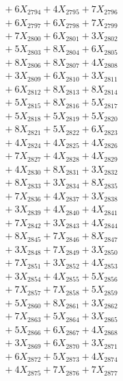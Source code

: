 \documentclass[a4paper,10pt]{article}
\begin{document}
{\begin{align}
&\;  + 6 X_{2794} + 4 X_{2795} + 7 X_{2796} \\[0.3ex]
&\;  + 6 X_{2797} + 6 X_{2798} + 7 X_{2799} \\[0.5ex]\allowbreak
&\;  + 7 X_{2800} + 6 X_{2801} + 3 X_{2802} \\[0.3ex]
&\;  + 5 X_{2803} + 8 X_{2804} + 6 X_{2805} \\[0.3ex]
&\;  + 8 X_{2806} + 8 X_{2807} + 4 X_{2808} \\[0.3ex]
&\;  + 3 X_{2809} + 6 X_{2810} + 3 X_{2811} \\[0.3ex]
&\;  + 6 X_{2812} + 8 X_{2813} + 8 X_{2814} \\[0.3ex]
&\;  + 5 X_{2815} + 8 X_{2816} + 5 X_{2817} \\[0.3ex]
&\;  + 5 X_{2818} + 5 X_{2819} + 5 X_{2820} \\[0.3ex]
&\;  + 8 X_{2821} + 5 X_{2822} + 6 X_{2823} \\[0.3ex]
&\;  + 4 X_{2824} + 4 X_{2825} + 4 X_{2826} \\[0.3ex]
&\;  + 7 X_{2827} + 4 X_{2828} + 4 X_{2829} \\[0.5ex]\allowbreak
&\;  + 4 X_{2830} + 8 X_{2831} + 3 X_{2832} \\[0.3ex]
&\;  + 8 X_{2833} + 3 X_{2834} + 8 X_{2835} \\[0.3ex]
&\;  + 7 X_{2836} + 4 X_{2837} + 3 X_{2838} \\[0.3ex]
&\;  + 3 X_{2839} + 4 X_{2840} + 4 X_{2841} \\[0.3ex]
&\;  + 7 X_{2842} + 3 X_{2843} + 4 X_{2844} \\[0.3ex]
&\;  + 8 X_{2845} + 7 X_{2846} + 8 X_{2847} \\[0.3ex]
&\;  + 3 X_{2848} + 7 X_{2849} + 3 X_{2850} \\[0.3ex]
&\;  + 7 X_{2851} + 3 X_{2852} + 4 X_{2853} \\[0.3ex]
&\;  + 3 X_{2854} + 4 X_{2855} + 5 X_{2856} \\[0.3ex]
&\;  + 7 X_{2857} + 7 X_{2858} + 5 X_{2859} \\[0.5ex]\allowbreak
&\;  + 5 X_{2860} + 8 X_{2861} + 3 X_{2862} \\[0.3ex]
&\;  + 7 X_{2863} + 5 X_{2864} + 3 X_{2865} \\[0.3ex]
&\;  + 5 X_{2866} + 6 X_{2867} + 4 X_{2868} \\[0.3ex]
&\;  + 3 X_{2869} + 6 X_{2870} + 3 X_{2871} \\[0.3ex]
&\;  + 6 X_{2872} + 5 X_{2873} + 4 X_{2874} \\[0.3ex]
&\;  + 4 X_{2875} + 7 X_{2876} + 7 X_{2877} \\[0.3ex]

\end{align}}
\end{document}
